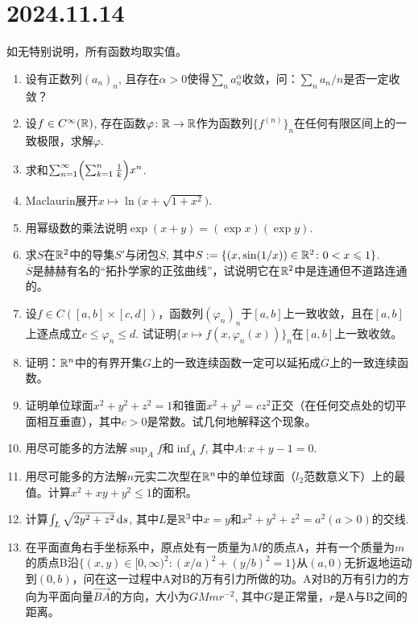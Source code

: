 \section*{2024.11.14}
如无特别说明，所有函数均取实值。
\begin{enumerate}
    \item 设有正数列$(a_n)_n$, 且存在$\alpha>0$使得$\sum_{n} a_n^\alpha$收敛，问：$\sum_{n}a_n/n$是否一定收敛？
    \item 设$f\in C^\infty(\mathbb{R})$, 存在函数$\varphi\colon\mathbb{R}\to\mathbb{R}$作为函数列$\bigl\{f^{(n)}\bigr\}_n$在任何有限区间上的一致极限，求解$\varphi$.
    \item 求和$\sum_{n=1}^\infty \Bigl(\sum_{k=1}^{n}\frac{1}{k}\Bigr) x^n$.
    \item Maclaurin展开$x\mapsto \ln \bigl(x+\sqrt{1+x^2}\bigr)$.
    \item 用幂级数的乘法说明$\exp (x+y)=(\exp x)(\exp y)$.
    \item 求$S$在$\mathbb{R}^2$中的导集$S'$与闭包$\overline S$, 其中$S:=\{(x,\sin (1/x))\in\mathbb{R}^2\colon 0<x\leqslant1\}$.\\
    $\overline S$是赫赫有名的``拓扑学家的正弦曲线''，试说明它在$\mathbb{R}^2$中是连通但不道路连通的。
    \item 设$f\in C([a,b]\times[c,d])$，函数列$(\varphi_n)_n$于$[a,b]$上一致收敛，且在$[a,b]$上逐点成立$c\leqslant \varphi_n\leqslant d$. 试证明$\bigl\{x\mapsto f(x,\varphi_n(x))\bigr\}_n$在$[a,b]$上一致收敛。
    \item 证明：$\mathbb{R}^n$中的有界开集$G$上的一致连续函数一定可以延拓成$\overline G$上的一致连续函数。
    \item 证明单位球面$x^2+y^2+z^2=1$和锥面$x^2+y^2=cz^2$正交（在任何交点处的切平面相互垂直），其中$c>0$是常数。试几何地解释这个现象。
    \item 用尽可能多的方法解$\sup_{A}f$和$\inf_{A}f$, 其中$A\colon x+y-1=0$.
    \item 用尽可能多的方法解$n$元实二次型在$\mathbb{R}^n$中的单位球面（$l_2$范数意义下）上的最值。计算$x^2+xy+y^2\leqslant 1$的面积。
    \item 计算$\int_L \sqrt{2y^2+z^2}\mathop{}\!\mathrm{d} s$, 其中$
        L$是$\mathbb{R}^3$中$x=y$和$x^2+y^2+z^2=a^2(a>0)$的交线.
    \item 在平面直角右手坐标系中，原点处有一质量为$M$的质点A，并有一个质量为$m$的质点B沿$\{(x,y)\in [0,\infty)^2\colon (x/a)^2+(y/b)^2=1\}$从$(a,0)$无折返地运动到$(0,b)$，问在这一过程中A对B的万有引力所做的功。A对B的万有引力的方向为平面向量$\overrightarrow{BA}$的方向，大小为$GMmr^{-2}$, 其中$G$是正常量，$r$是A与B之间的距离。

\end{enumerate}
